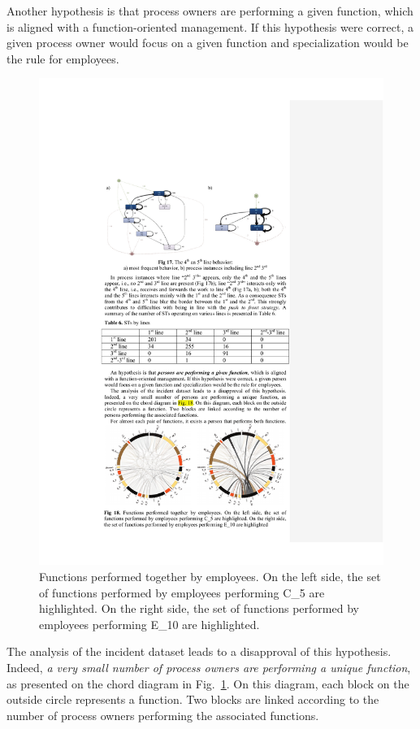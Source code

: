 \documentclass[lnbip]{svmultln}
\begin{document}
Another hypothesis is that process owners are performing a given function, which is aligned with a function-oriented management. If this hypothesis were correct, a given process owner would focus on a given function and specialization would be the rule for employees.

\begin{figure}
  \begin{center}
    \includegraphics[width=\textwidth]{"figs/pic 20"}
  \end{center}
  \caption{Functions performed together by employees. On the left side, the set of functions performed by employees performing C\_5 are highlighted. On the right side, the set of functions performed by employees performing E\_10 are highlighted.}
  \label{fig:FunctionsByPersons}
\end{figure}


The analysis of the incident dataset leads to a disapproval of this hypothesis. Indeed, \emph{a very small number of process owners are performing a unique function}, as presented on the chord diagram in Fig.~\ref{fig:FunctionsByPersons}. On this diagram, each block on the outside circle represents a function. Two blocks are linked according to the number of process owners performing the associated functions. 
\end{document}
